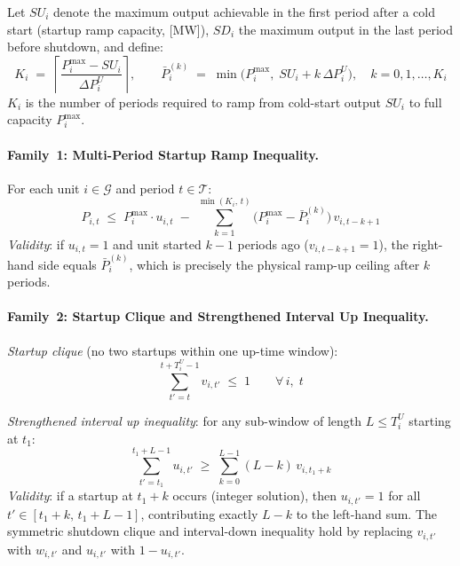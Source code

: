 Let $SU_i$ denote the maximum output achievable in the first period after a
cold start (startup ramp capacity, [MW]), $SD_i$ the maximum output in the
last period before shutdown, and define:
\begin{equation}\label{eq:ramp-horizon}
  K_i \;=\; \left\lceil \frac{P^{\max}_i - SU_i}{\Delta P^U_i} \right\rceil,
  \qquad
  \bar{P}_i^{(k)} \;=\; \min\!\bigl(P^{\max}_i,\; SU_i + k\,\Delta P^U_i\bigr),
  \quad k = 0,1,\ldots,K_i
\end{equation}
$K_i$ is the number of periods required to ramp from cold-start output $SU_i$
to full capacity $P^{\max}_i$.

\paragraph{Family~1: Multi-Period Startup Ramp Inequality.}

For each unit $i \in \mathcal{G}$ and period $t \in \mathcal{T}$:
\begin{equation}\label{eq:cut-ramp-up}
  \boxed{
    P_{i,t}
    \;\leq\;
    P^{\max}_i \cdot u_{i,t}
    \;-\;
    \sum_{k=1}^{\min(K_i,\,t)} \bigl(P^{\max}_i - \bar{P}_i^{(k)}\bigr)\,v_{i,t-k+1}
  }
\end{equation}
\textit{Validity}: if $u_{i,t}=1$ and unit started $k-1$ periods ago
($v_{i,t-k+1}=1$), the right-hand side equals $\bar{P}_i^{(k)}$, which is
precisely the physical ramp-up ceiling after $k$ periods.

\paragraph{Family~2: Startup Clique and Strengthened Interval Up Inequality.}

\emph{Startup clique} (no two startups within one up-time window):
\begin{equation}\label{eq:cut-startup-clique}
  \sum_{t'=t}^{t+T^U_i-1} v_{i,t'} \;\leq\; 1
  \qquad \forall\, i,\; t
\end{equation}

\emph{Strengthened interval up inequality}: for any sub-window of length
$L \leq T^U_i$ starting at $t_1$:
\begin{equation}\label{eq:cut-interval-up}
  \boxed{
    \sum_{t'=t_1}^{t_1+L-1} u_{i,t'}
    \;\geq\;
    \sum_{k=0}^{L-1} (L - k)\,v_{i,t_1+k}
  }
\end{equation}
\textit{Validity}: if a startup at $t_1+k$ occurs (integer solution), then
$u_{i,t'}=1$ for all $t' \in [t_1+k,\,t_1+L-1]$, contributing exactly
$L-k$ to the left-hand sum.  The symmetric shutdown clique and interval-down
inequality hold by replacing $v_{i,t'}$ with $w_{i,t'}$ and $u_{i,t'}$ with
$1-u_{i,t'}$.

